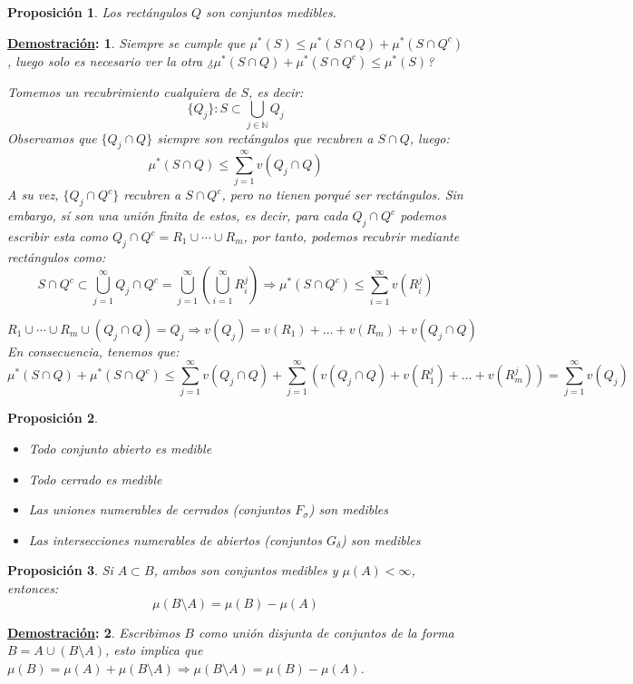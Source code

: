 \documentclass[10pt,a4paper,openright]{book}
\theoremstyle{break}
\newtheorem*{prop}{Proposición}
\newtheorem*{demo}{\underline{Demostración}:}
\begin{document}
\begin{prop}
Los rectángulos $Q$ son conjuntos medibles. 
\end{prop}
\begin{demo}
Siempre se cumple que $ \mu^*\left( S \right) \le \mu^*\left( S\cap Q \right) + \mu^*\left( S\cap Q^c \right)$, luego solo es necesario ver la otra ¿$ \mu^*\left( S\cap Q \right) + \mu^*\left( S\cap Q^c \right) \le \mu^*\left( S \right)$?

Tomemos un recubrimiento cualquiera de $S$, es decir:
$$\{Q_j\}: S \subset \bigcup_{j \in \mathbb{N}} Q_j$$
Observamos que $ \{Q_j \cap Q\} $ siempre son rectángulos que recubren a $S\cap Q$, luego:
$$\mu^*\left( S\cap Q \right) \le \sum_{j=1}^{\infty} v\left( Q_j \cap Q \right)$$
A su vez, $ \{Q_j \cap Q^c\}$ recubren a $S\cap Q^c$, pero no tienen porqué ser rectángulos. Sin embargo, sí son una unión finita de estos, es decir, para cada $Q_j \cap Q^c$ podemos escribir esta como $Q_j \cap Q^c = R_1 \cup \cdots \cup R_m$, por tanto, podemos recubrir mediante rectángulos como:
$$S \cap Q^c \subset \bigcup_{j=1}^\infty Q_j\cap Q^c = \bigcup_{j=1}^\infty \left(\bigcup_{i=1}^\infty  R_i^j \right)\Rightarrow \mu^*\left( S\cap Q^c \right) \le \sum_{i=1}^{\infty} v\left( R^j_i \right) $$

$$ R_1 \cup \cdots \cup R_m \cup \left( Q_j \cap Q \right) = Q_j \Rightarrow v\left( Q_j \right) = v\left( R_1 \right) +\ldots + v\left( R_m \right) + v\left( Q_j\cap Q \right) $$
En consecuencia, tenemos que:
$$\mu^*\left( S\cap Q \right) + \mu^*\left( S \cap Q^c \right) \le \sum_{j=1}^{\infty} v\left( Q_j \cap Q \right) + \sum_{j=1}^{\infty} \left( v\left( Q_j\cap Q \right) + v\left( R_1^j \right) +\ldots + v\left( R_m^j \right) \right) = \sum_{j=1}^{\infty} v\left( Q_j \right)$$
\end{demo}

\begin{prop}
\begin{itemize}
\item Todo conjunto abierto es medible
\item Todo cerrado es medible
\item Las uniones numerables de cerrados (conjuntos $F_\sigma$) son medibles
\item Las intersecciones numerables de abiertos  (conjuntos $G_\delta$) son medibles
\end{itemize}
\end{prop}

\begin{prop}
Si $A\subset B$, ambos son conjuntos medibles y $\mu(A) < \infty$, entonces:
$$\mu(B\setminus A) = \mu(B) - \mu(A)$$
\end{prop}
\begin{demo}
Escribimos $B$ como unión disjunta de conjuntos de la forma $B=A\cup (B\setminus A)$, esto implica que $\mu(B) = \mu(A) + \mu(B\setminus A) \Rightarrow \mu(B\setminus A) =  \mu(B) - \mu(A)$.
\end{demo}
\end{document}
